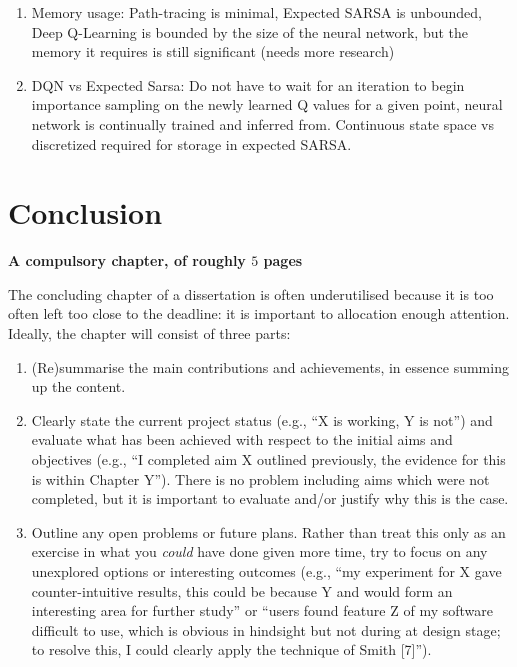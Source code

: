 \documentclass[ %
                    author={Callum Pearce},
                supervisor={Dr. Neill Campbell},
                    degree={MEng},
                     title={How effective are Temporal difference learning methods in reducing the number of zero contribution light paths in Path tracing?},
                  subtitle={},
                      type={research},
                      year={2019} ]{dissertation}
\begin{document}
\begin{enumerate}
\item Memory usage: Path-tracing is minimal, Expected SARSA is unbounded, Deep Q-Learning is bounded by the size of the neural network, but the memory it requires is still significant (needs more research)

\item DQN vs Expected Sarsa: Do not have to wait for an iteration to begin
 importance sampling on the newly learned Q values for a given point, 
 neural network is continually trained and inferred from. Continuous state 
 space vs discretized required for storage in expected SARSA.
\end{enumerate}


\chapter{Conclusion}
\label{chap:conclusion}

{\bf A compulsory chapter,     of roughly $5$ pages} 
\vspace{1cm} 

\noindent
The concluding chapter of a dissertation is often underutilised because it 
is too often left too close to the deadline: it is important to allocation
enough attention.  Ideally, the chapter will consist of three parts:

\begin{enumerate}
\item (Re)summarise the main contributions and achievements, in essence
      summing up the content.
\item Clearly state the current project status (e.g., ``X is working, Y 
      is not'') and evaluate what has been achieved with respect to the 
      initial aims and objectives (e.g., ``I completed aim X outlined 
      previously, the evidence for this is within Chapter Y'').  There 
      is no problem including aims which were not completed, but it is 
      important to evaluate and/or justify why this is the case.
\item Outline any open problems or future plans.  Rather than treat this
      only as an exercise in what you {\em could} have done given more 
      time, try to focus on any unexplored options or interesting outcomes
      (e.g., ``my experiment for X gave counter-intuitive results, this 
      could be because Y and would form an interesting area for further 
      study'' or ``users found feature Z of my software difficult to use,
      which is obvious in hindsight but not during at design stage; to 
      resolve this, I could clearly apply the technique of Smith [7]'').
\end{enumerate}
\end{document}
